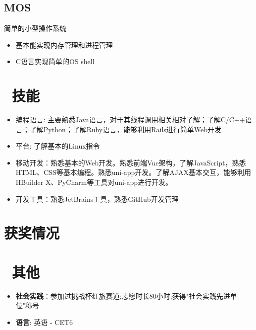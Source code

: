 \documentclass{resume}
\begin{document}
\begin{onehalfspacing}
\subsection{\textbf{MOS}}
简单的小型操作系统
\begin{itemize}
\item 基本能实现内存管理和进程管理
\item C语言实现简单的OS shell
\end{itemize}

\end{onehalfspacing}

\section{\faCogs\  技能}
\begin{itemize}[parsep=0.5ex]
  \item 编程语言: 主要熟悉Java语言，对于其线程调用相关相对了解；了解C/C++语言；了解Python；了解Ruby语言，能够利用Rails进行简单Web开发
  \item 平台: 了解基本的Linux指令
  \item 移动开发：熟悉基本的Web开发。熟悉前端Vue架构，了解JavaScript，熟悉HTML、CSS等基本编程。熟悉uni-app开发。了解AJAX基本交互，能够利用HBuilder X、PyCharm等工具对uni-app进行开发。
  \item 开发工具：熟悉JetBrains工具，熟悉GitHub开发管理
\end{itemize}

\section{\faDatabase 获奖情况}
\section{\faEdit \ 其他}
\begin{itemize}[parsep=0.5ex]
  \item \textbf{社会实践}：参加过挑战杯红旅赛道;志愿时长80小时;获得"社会实践先进单位"称号
  \item \textbf{语言}: 英语 - CET6
\end{itemize}

%
%
\end{document}
